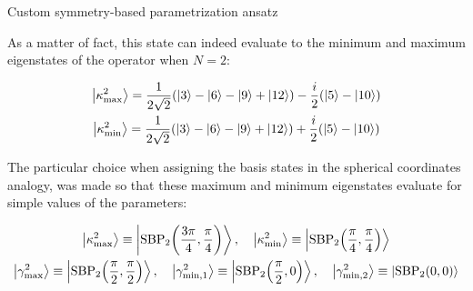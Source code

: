 \documentclass[9pt, handout, aspectratio=169]{beamer}	%
\begin{document}
\begin{frame}[allowframebreaks]{Custom symmetry-based parametrization ansatz}
\break

	As a matter of fact, this state can indeed evaluate to the minimum and maximum eigenstates of the operator when $N=2$:

	\begin{gather*}
	  \ket{\kappa_{\text{max}}^{2}} =
	    \frac{1}{2\sqrt{2}} \qty(\ket{3}-\ket{6}-\ket{9}+\ket{12}) -
	    \frac{i}{2} \qty(\ket{5}-\ket{10}) \\
	  \ket{\kappa_{\text{min}}^{2}} =
	  \frac{1}{2\sqrt{2}} \qty(\ket{3}-\ket{6}-\ket{9}+\ket{12}) +
	  \frac{i}{2} \qty(\ket{5}-\ket{10})
	\end{gather*}

	The particular choice when assigning the basis states in the spherical coordinates analogy, was made so that these maximum and minimum eigenstates evaluate for simple values of the parameters:

	\begin{gather*}
	  \ket{\kappa_{\text{max}}^{2}} \equiv
	    \ket{\text{SBP}_{2} \qty(\frac{3\pi}{4}, \frac{\pi}{4})} \qc
	  \ket{\kappa_{\text{min}}^{2}} \equiv
	    \ket{\text{SBP}_{2} \qty(\frac{\pi}{4}, \frac{\pi}{4})} \\
	  \ket{\gamma_{\text{max}}^{2}} \equiv
	    \ket{\text{SBP}_{2} \qty(\frac{\pi}{2}, \frac{\pi}{2})} \qc
	  \ket{\gamma_{\text{min},1}^{2}} \equiv
	    \ket{\text{SBP}_{2} \qty(\frac{\pi}{2}, 0)} \qc
	  \ket{\gamma_{\text{min},2}^{2}} \equiv
	    \ket{\text{SBP}_{2} \qty(0, 0)}
	\end{gather*}

\end{frame}

\end{document}
